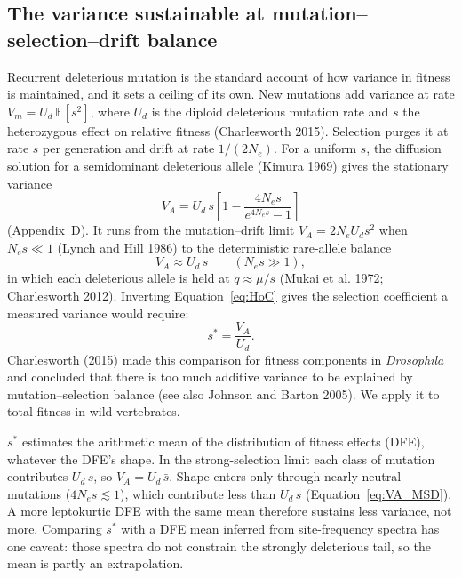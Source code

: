 \documentclass[12pt]{article}
\begin{document}
\subsection{The variance sustainable at mutation--selection--drift balance}\label{msdb}
Recurrent deleterious mutation is the standard account of how variance in fitness is maintained, and it sets a ceiling of its own. New mutations add variance at rate $V_m = U_d\,\mathbb{E}[s^2]$, where $U_d$ is the diploid deleterious mutation rate and $s$ the heterozygous effect on relative fitness (Charlesworth 2015). Selection purges it at rate $s$ per generation and drift at rate $1/(2N_e)$. For a uniform $s$, the diffusion solution for a semidominant deleterious allele (Kimura 1969) gives the stationary variance
\begin{equation}
V_A = U_d\,s\left[1 - \frac{4N_es}{e^{4N_es} - 1}\right] \label{eq:VA_MSD}
\end{equation}
(Appendix~D). It runs from the mutation--drift limit $V_A = 2N_eU_ds^2$ when $N_es \ll 1$ (Lynch and Hill 1986) to the deterministic rare-allele balance
\begin{equation}
V_A \approx U_d\,s \qquad (N_es \gg 1), \label{eq:HoC}
\end{equation}
in which each deleterious allele is held at $q \approx \mu/s$ (Mukai et al. 1972; Charlesworth 2012). Inverting Equation~\eqref{eq:HoC} gives the selection coefficient a measured variance would require:
\begin{equation}
s^* = \frac{V_A}{U_d}. \label{eq:sstar}
\end{equation}
Charlesworth (2015) made this comparison for fitness components in \emph{Drosophila} and concluded that there is too much additive variance to be explained by mutation--selection balance (see also Johnson and Barton 2005). We apply it to total fitness in wild vertebrates.

$s^*$ estimates the arithmetic mean of the distribution of fitness effects (DFE), whatever the DFE's shape. In the strong-selection limit each class of mutation contributes $U_d\,s$, so $V_A = U_d\,\bar{s}$. Shape enters only through nearly neutral mutations ($4N_es \lesssim 1$), which contribute less than $U_d\,s$ (Equation~\eqref{eq:VA_MSD}). A more leptokurtic DFE with the same mean therefore sustains less variance, not more. Comparing $s^*$ with a DFE mean inferred from site-frequency spectra has one caveat: those spectra do not constrain the strongly deleterious tail, so the mean is partly an extrapolation.
\end{document}
